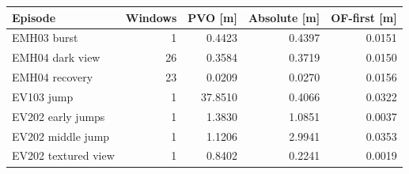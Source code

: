 \begin{tabular}{@{}lrrrr@{}}
\toprule
Episode & Windows & PVO [m] & Absolute [m] & OF-first [m] \\
\midrule
EMH03 burst & 1 & 0.4423 & 0.4397 & 0.0151 \\
EMH04 dark view & 26 & 0.3584 & 0.3719 & 0.0150 \\
EMH04 recovery & 23 & 0.0209 & 0.0270 & 0.0156 \\
EV103 jump & 1 & 37.8510 & 0.4066 & 0.0322 \\
EV202 early jumps & 1 & 1.3830 & 1.0851 & 0.0037 \\
EV202 middle jump & 1 & 1.1206 & 2.9941 & 0.0353 \\
EV202 textured view & 1 & 0.8402 & 0.2241 & 0.0019 \\
\bottomrule
\end{tabular}
